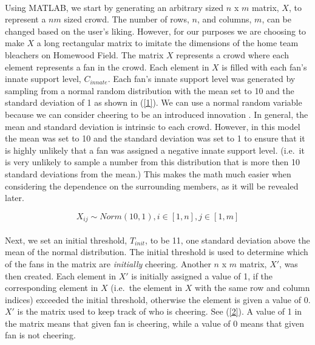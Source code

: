 \documentclass[oneside,12pt]{report}
\begin{document}
\paragraph{}
Using MATLAB, we start by generating an arbitrary sized $n$ x $m$ matrix, $X$, to represent a $nm$ sized crowd. The number of rows, $n$, and columns, $m$, can be changed based on the user's liking. However, for our purposes we are choosing to make $X$ a long rectangular matrix to imitate the dimensions of the home team bleachers on Homewood Field. The matrix $X$ represents a crowd where each element represents a fan in the crowd. Each element in $X$ is filled with each fan's innate support level, $C_{innate}$. Each fan's innate support level was generated by sampling from a normal random distribution with the mean set to 10 and the standard deviation of 1 as shown in (\ref{1}). We can use a normal random variable because we can consider cheering to be an introduced innovation \cite{DI2003}. In general, the mean and standard deviation is intrinsic to each crowd. However, in this model the mean was set to 10 and the standard deviation was set to 1 to ensure that it is highly unlikely that a fan was assigned a negative innate support level. (i.e.~it is very unlikely to sample a number from this distribution that is more then 10 standard deviations from the mean.) This makes the math much easier when considering the dependence on the surrounding members, as it will be revealed later.

\begin{equation}
X_{ij}\sim Norm(10,1), i\in[1,n], j\in[1,m]
\label{1}
\end{equation}

\paragraph{}
Next, we set an initial threshold, $T_{init}$, to be 11, one standard deviation above the mean of the normal distribution. The initial threshold is used to determine which of the fans in the matrix are \textit{initially} cheering. Another $n$ x $m$ matrix, $X'$, was then created. Each element in $X'$ is initially assigned a value of 1, if the corresponding element in $X$ (i.e.~the element in $X$ with the same row and column indices) exceeded the initial threshold, otherwise the element is given a value of 0. $X'$ is the matrix used to keep track of who is cheering. See (\ref{2}). A value of 1 in the matrix means that given fan is cheering, while a value of 0 means that given fan is not cheering.
\end{document}
